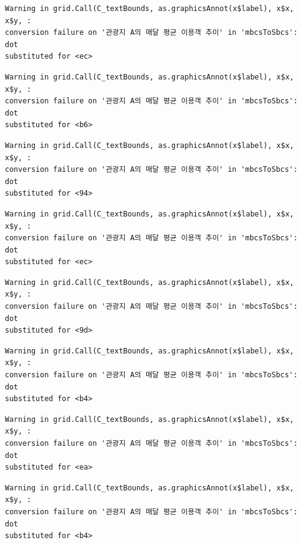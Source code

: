 \documentclass[
  letterpaper,
  DIV=11,
  numbers=noendperiod]{scrreprt}
\begin{document}
\begin{verbatim}
Warning in grid.Call(C_textBounds, as.graphicsAnnot(x$label), x$x, x$y, :
conversion failure on '관광지 A의 매달 평균 이용객 추이' in 'mbcsToSbcs': dot
substituted for <ec>
\end{verbatim}

\begin{verbatim}
Warning in grid.Call(C_textBounds, as.graphicsAnnot(x$label), x$x, x$y, :
conversion failure on '관광지 A의 매달 평균 이용객 추이' in 'mbcsToSbcs': dot
substituted for <b6>
\end{verbatim}

\begin{verbatim}
Warning in grid.Call(C_textBounds, as.graphicsAnnot(x$label), x$x, x$y, :
conversion failure on '관광지 A의 매달 평균 이용객 추이' in 'mbcsToSbcs': dot
substituted for <94>
\end{verbatim}

\begin{verbatim}
Warning in grid.Call(C_textBounds, as.graphicsAnnot(x$label), x$x, x$y, :
conversion failure on '관광지 A의 매달 평균 이용객 추이' in 'mbcsToSbcs': dot
substituted for <ec>
\end{verbatim}

\begin{verbatim}
Warning in grid.Call(C_textBounds, as.graphicsAnnot(x$label), x$x, x$y, :
conversion failure on '관광지 A의 매달 평균 이용객 추이' in 'mbcsToSbcs': dot
substituted for <9d>
\end{verbatim}

\begin{verbatim}
Warning in grid.Call(C_textBounds, as.graphicsAnnot(x$label), x$x, x$y, :
conversion failure on '관광지 A의 매달 평균 이용객 추이' in 'mbcsToSbcs': dot
substituted for <b4>
\end{verbatim}

\begin{verbatim}
Warning in grid.Call(C_textBounds, as.graphicsAnnot(x$label), x$x, x$y, :
conversion failure on '관광지 A의 매달 평균 이용객 추이' in 'mbcsToSbcs': dot
substituted for <ea>
\end{verbatim}

\begin{verbatim}
Warning in grid.Call(C_textBounds, as.graphicsAnnot(x$label), x$x, x$y, :
conversion failure on '관광지 A의 매달 평균 이용객 추이' in 'mbcsToSbcs': dot
substituted for <b4>
\end{verbatim}
\end{document}
